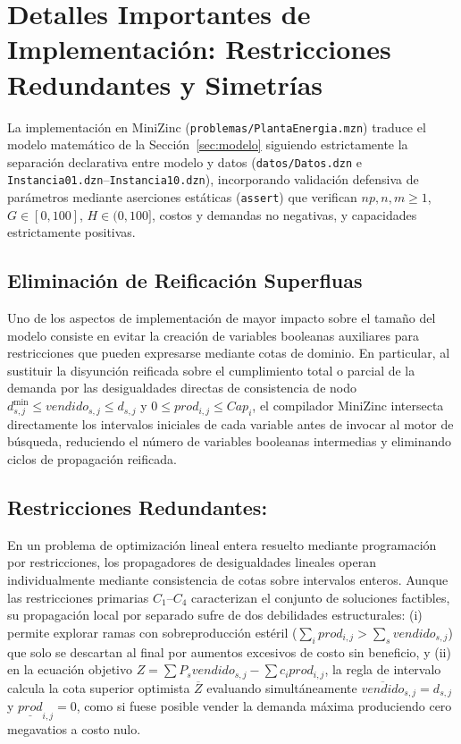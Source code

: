 \section{Detalles Importantes de Implementación: Restricciones Redundantes y Simetrías}
\label{sec:implementacion}

La implementación en MiniZinc (\texttt{problemas/PlantaEnergia.mzn}) traduce el modelo matemático de la Sección~\ref{sec:modelo} siguiendo estrictamente la separación declarativa entre modelo y datos (\texttt{datos/Datos.dzn} e \texttt{Instancia01.dzn}--\texttt{Instancia10.dzn}), incorporando validación defensiva de parámetros mediante aserciones estáticas (\texttt{assert}) que verifican $np, n, m \ge 1$, $G \in [0, 100]$, $H \in (0, 100]$, costos y demandas no negativas, y capacidades estrictamente positivas.

\subsection{Eliminación de Reificación Superfluas}

Uno de los aspectos de implementación de mayor impacto sobre el tamaño del modelo consiste en evitar la creación de variables booleanas auxiliares para restricciones que pueden expresarse mediante cotas de dominio. En particular, al sustituir la disyunción reificada sobre el cumplimiento total o parcial de la demanda por las desigualdades directas de consistencia de nodo $d^{\min}_{s,j} \le vendido_{s,j} \le d_{s,j}$ y $0 \le prod_{i,j} \le Cap_i$, el compilador MiniZinc intersecta directamente los intervalos iniciales de cada variable antes de invocar al motor de búsqueda, reduciendo el número de variables booleanas intermedias y eliminando ciclos de propagación reificada.

\subsection{Restricciones Redundantes:}
\label{subsec:redundantes}

En un problema de optimización lineal entera resuelto mediante programación por restricciones, los propagadores de desigualdades lineales operan individualmente mediante consistencia de cotas sobre intervalos enteros. Aunque las restricciones primarias $C_1$--$C_4$ caracterizan el conjunto de soluciones factibles, su propagación local por separado sufre de dos debilidades estructurales: (i) permite explorar ramas con sobreproducción estéril ($\sum_i prod_{i,j} > \sum_s vendido_{s,j}$) que solo se descartan al final por aumentos excesivos de costo sin beneficio, y (ii) en la ecuación objetivo $Z = \sum P_s vendido_{s,j} - \sum c_i prod_{i,j}$, la regla de intervalo calcula la cota superior optimista $\overline{Z}$ evaluando simultáneamente $\overline{vendido}_{s,j} = d_{s,j}$ y $\underline{prod}_{i,j} = 0$, como si fuese posible vender la demanda máxima produciendo cero megavatios a costo nulo.

